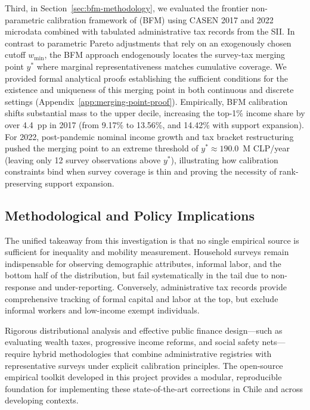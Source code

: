 Third, in Section~\ref{sec:bfm-methodology}, we evaluated the frontier non-parametric calibration framework of \citet{blanchet2022weight} (BFM) using CASEN 2017 and 2022 microdata combined with tabulated administrative tax records from the SII. In contrast to parametric Pareto adjustments that rely on an exogenously chosen cutoff $w_{\min}$, the BFM approach endogenously locates the survey-tax merging point $y^*$ where marginal representativeness matches cumulative coverage. We provided formal analytical proofs establishing the sufficient conditions for the existence and uniqueness of this merging point in both continuous and discrete settings (Appendix~\ref{app:merging-point-proof}). Empirically, BFM calibration shifts substantial mass to the upper decile, increasing the top-1\% income share by over 4.4~pp in 2017 (from 9.17\% to 13.56\%, and 14.42\% with support expansion). For 2022, post-pandemic nominal income growth and tax bracket restructuring pushed the merging point to an extreme threshold of $y^* \approx 190.0$~M CLP/year (leaving only 12 survey observations above $y^*$), illustrating how calibration constraints bind when survey coverage is thin and proving the necessity of rank-preserving support expansion.

\subsection*{Methodological and Policy Implications}

The unified takeaway from this investigation is that no single empirical source is sufficient for inequality and mobility measurement. Household surveys remain indispensable for observing demographic attributes, informal labor, and the bottom half of the distribution, but fail systematically in the tail due to non-response and under-reporting. Conversely, administrative tax records provide comprehensive tracking of formal capital and labor at the top, but exclude informal workers and low-income exempt individuals. 

Rigorous distributional analysis and effective public finance design---such as evaluating wealth taxes, progressive income reforms, and social safety nets---require hybrid methodologies that combine administrative registries with representative surveys under explicit calibration principles. The open-source empirical toolkit developed in this project provides a modular, reproducible foundation for implementing these state-of-the-art corrections in Chile and across developing contexts.

